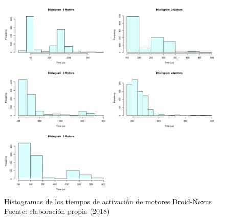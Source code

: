 \begin{figure}
 \begin{center} 
   	\includegraphics[width=1.0\textwidth]{evaluation/graphics/Droid/Nexus/HistMotorsDroidNexus.png} 
   	\captionsetup{justification=centering}
    \caption[Histogramas de los tiempos de activación de motores Droid-Nexus]{Histogramas de los tiempos de activación de motores  Droid-Nexus\\Fuente: elaboración propia (2018)} 
    \label{fig:droid-nexus-hist-motors}
  \end{center}
\end{figure}

